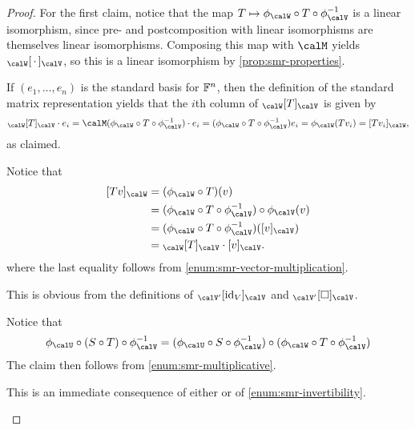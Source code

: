 \begin{proof}
    For the first claim, notice that the map $T \mapsto \coordmap{\calW} \circ T \circ \inv{\coordmap{\calV}}$ is a linear isomorphism, since pre- and postcomposition with linear isomorphisms are themselves linear isomorphisms. Composing this map with $\calM$ yields $\mr{\calW}{\,\cdot\,}{\calV}$, so this is a linear isomorphism by \cref{prop:smr-properties}.
    \begin{proofsec}
        \item[\itemref{enum:mr-explicit-formula}]
        If $(e_1, \ldots, e_n)$ is the standard basis for $\mathbb{F}^n$, then the definition of the standard matrix representation yields that the $i$th column of $\mr{\calW}{T}{\calV}$ is given by
        \begin{equation*}
            \mr{\calW}{T}{\calV} \cdot e_i
                = \smr{\coordmap{\calW} \circ T \circ \inv{\coordmap{\calV}}} \cdot e_i
                = (\coordmap{\calW} \circ T \circ \inv{\coordmap{\calV}}) e_i
                = \coordmap{\calW}(Tv_i)
                = \coordvec{Tv_i}{\calW},
        \end{equation*}
        as claimed.

        \item[\itemref{enum:mr-vector-multiplication}]
        Notice that
        \begin{align*}
            \coordvec{Tv}{\calW}
                &= (\coordmap{\calW} \circ T)(v) \\
                &= (\coordmap{\calW} \circ T \circ \inv{\coordmap{\calV}}) \circ \coordmap{\calV}(v) \\
                &= (\coordmap{\calW} \circ T \circ \inv{\coordmap{\calV}})(\coordvec{v}{\calV}) \\
                &= \mr{\calW}{T}{\calV} \cdot \coordvec{v}{\calV}.
        \end{align*}
        where the last equality follows from \cref{enum:smr-vector-multiplication}.

        \item[\itemref{enum:mr-of-identity-map}]
        This is obvious from the definitions of $\mr{\calV'}{\id_V}{\calV}$ and $\basischangemat{\calV'}{\calV}$.

        \item[\itemref{enum:mr-multiplicative}]
        Notice that
        \begin{equation*}
            \coordmap{\calU} \circ (S \circ T) \circ \inv{\coordmap{\calV}}
                = (\coordmap{\calU} \circ S \circ \inv{\coordmap{\calW}}) \circ (\coordmap{\calW} \circ T \circ \inv{\coordmap{\calV}})
        \end{equation*}
        The claim then follows from \cref{enum:smr-multiplicative}.

        \item[\itemref{enum:mr-invertibility}]
        This is an immediate consequence of either  or of \cref{enum:smr-invertibility}.
    \end{proofsec}
\end{proof}

